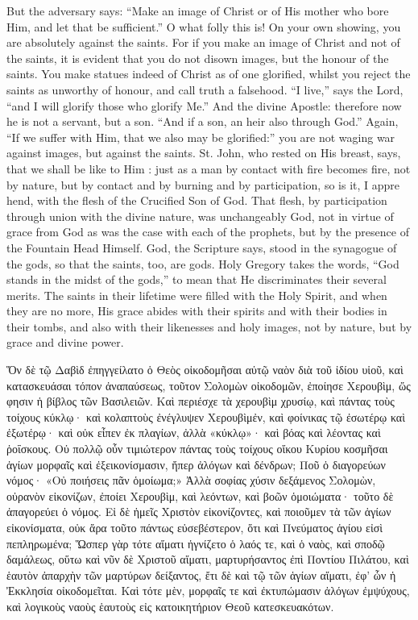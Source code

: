\documentclass[10pt]{book}
\newcommand{\switchgreek}[1][]{\selectlanguage{polutonikogreek} \switchcolumn*[#1]}
\begin{document}
\begin{paracol}{2}
But the adversary says: ``Make an image of 
Christ or of His mother who bore Him, and let that be sufficient.'' O what 
folly this is! On your own showing, you are 
absolutely against the saints. For if you make 
an image of Christ and not of the saints, it is 
evident that you do not disown images, but 
the honour of the saints. You make statues 
indeed of Christ as of one glorified, whilst you 
reject the saints as unworthy of honour, and 
call truth a falsehood. ``I live,'' says the Lord, 
``and I will glorify those who glorify Me.'' 
And the divine Apostle: therefore now he is 
not a servant, but a son. ``And if a son, an 
heir also through God.'' Again, ``If we suffer 
with Him, that we also may be glorified:'' 
you are not waging war against images, but 
against the saints. St. John, who rested on 
His breast, says, that we shall be like to Him : 
just as a man by contact with fire becomes 
fire, not by nature, but by contact and by 
burning and by participation, so is it, I appre 
hend, with the flesh of the Crucified Son of 
God. That flesh, by participation through 
union with the divine nature, 
was unchangeably God, not in virtue of grace 
from God as was the case with each of the 
prophets, but by the presence of the Fountain 
Head Himself. God, the Scripture says, 
stood in the synagogue of the gods, so that the 
saints, too, are gods. Holy Gregory takes the 
words, ``God stands in the midst of the gods,''
to mean that He discriminates their several 
merits. The saints in their lifetime were 
filled with the Holy Spirit, and when they are 
no more, His grace abides with their spirits 
and with their bodies in their tombs, and also 
with their likenesses and holy images, not by 
nature, but by grace and divine power. 

\switchgreek

Ὅν δὲ τῷ Δαβὶδ ἐπηγγείλατο ὁ Θεὸς οἰκοδομῆσαι αὐτῷ ναὸν διὰ τοῦ ἰδίου υἱοῦ, καὶ κατασκευάσαι τόπον ἀναπαύσεως, τοῦτον Σολομὼν οἰκοδομῶν, ἐποίησε Χερουβὶμ, ὥς φησιν ἡ βίβλος τῶν Βασιλειῶν.
Καὶ περιέσχε τὰ χερουβὶμ χρυσίῳ,
καὶ πάντας τοὺς τοίχους κύκλῳ·
καὶ κολαπτοὺς ἐνέγλυψεν Χερουβὶμἐν,
καὶ φοίνικας τῷ ἐσωτέρῳ καὶ ἐξωτέρῳ·
καὶ οὐκ εἶπεν ἐκ πλαγίων, ἀλλὰ «κύκλῳ»·
καὶ βόας καὶ λέοντας καὶ ῥοΐσκους.
Οὐ πολλῷ οὖν τιμιώτερον πάντας τοὺς τοίχους οἴκου Κυρίου κοσμῆσαι ἁγίων μορφαῖς καὶ ἐξεικονίσμασιν, ἤπερ ἀλόγων καὶ δένδρων; Ποῦ ὁ διαγορεύων νόμος·
«Οὐ ποιήσεις πᾶν ὁμοίωμα;»
Ἀλλὰ σοφίας χύσιν δεξάμενος Σολομὼν, οὐρανὸν εἰκονίζων, ἐποίει Χερουβὶμ, καὶ λεόντων, καὶ βοῶν ὁμοιώματα·
τοῦτο δὲ ἀπαγορεύει ὁ νόμος.
Εἰ δὲ ἡμεῖς Χριστὸν εἰκονίζοντες, καὶ ποιοῦμεν τὰ τῶν ἁγίων εἰκονίσματα, οὐκ ἄρα τοῦτο πάντως εὐσεβέστερον, ὅτι καὶ Πνεύματος ἁγίου εἰσὶ πεπληρωμένα;
Ὥσπερ γὰρ τότε αἵματι ἡγνίζετο ὁ λαός τε, καὶ ὁ ναὸς, καὶ σποδῷ δαμάλεως, οὕτω καὶ νῦν δὲ Χριστοῦ αἵματι, μαρτυρήσαντος ἐπὶ Ποντίου Πιλάτου, καὶ ἑαυτὸν ἀπαρχὴν τῶν μαρτύρων δείξαντος, ἔτι δὲ καὶ τῷ τῶν ἁγίων αἵματι,
ἐφ’ ὧν ἡ Ἐκκλησία οἰκοδομεῖται.
Καὶ τότε μὲν, μορφαῖς τε καὶ ἐκτυπώμασιν ἀλόγων ἐμψύχους, καὶ λογικοὺς ναοὺς ἑαυτοὺς εἰς κατοικητήριον Θεοῦ κατεσκευακότων.


\end{paracol}
\end{document}
